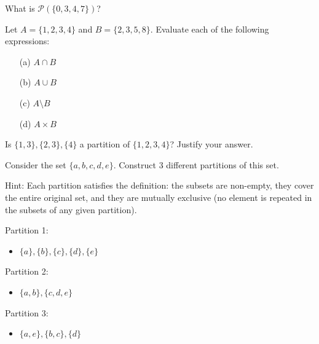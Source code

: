 \documentclass[
	12pt, %
	fleqn, %
	a4paper, %
]{LegrandOrangeBook}
\begin{document}
\begin{exercise}
What is \(\mathcal{P}(\{0, 3, 4, 7\})\)?
\end{exercise}

\begin{exercise}
Let \( A = \{1, 2, 3, 4\} \) and \( B = \{2, 3, 5, 8\} \). Evaluate each of the following expressions:
\begin{enumerate}
    \item[(a)] \( A \cap B \)
    \item[(b)] \( A \cup B \)
    \item[(c)] \( A \setminus B \)
    \item[(d)] \( A \times B \)
\end{enumerate}
\end{exercise}

\begin{exercise}
     Is \(\{1, 3\}, \{2, 3\}, \{4\}\) a partition of \(\{1, 2, 3, 4\}\)? Justify your answer.
\end{exercise}

\begin{exercise}
    Consider the set \(\{a, b, c, d, e\}\). Construct 3 different partitions of this set.
\end{exercise}
Hint: Each partition satisfies the definition: the subsets are non-empty, they cover the entire original set, and they are mutually exclusive (no element is repeated in the subsets of any given partition).

Partition 1:
\begin{itemize}
    \item \(\{a\}, \{b\}, \{c\}, \{d\}, \{e\}\)
\end{itemize}

Partition 2:
\begin{itemize}
    \item \(\{a, b\}, \{c, d, e\}\)
\end{itemize}

Partition 3:
\begin{itemize}
    \item \(\{a, e\}, \{b, c\}, \{d\}\)
\end{itemize}
\end{document}
